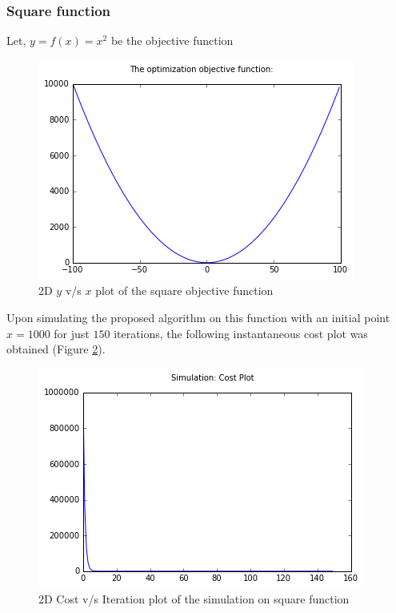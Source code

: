 \documentclass{article}
\begin{document}
\subsubsection{Square function}
\begin{center}
	Let, $y = f(x) = x^2$ be the objective function
\end{center}

\begin{figure}[h]
\begin{center}
\includegraphics[scale=0.5]{diagrams/square_function.png}
\end{center}
\caption{2D $y$ v/s $x$ plot of the square objective function}
\label{fig:figure_2}
\end{figure}

Upon simulating the proposed algorithm on this function with an initial point $x = 1000$ for just $150$ iterations, the following instantaneous cost plot was obtained (Figure \ref{fig:figure_3}). 

\begin{figure}[h]
\begin{center}
\includegraphics[scale=0.5]{diagrams/ranik_on_square.png}
\end{center}
\caption{2D Cost v/s Iteration plot of the simulation on square function}
\label{fig:figure_3}
\end{figure}
\end{document}
